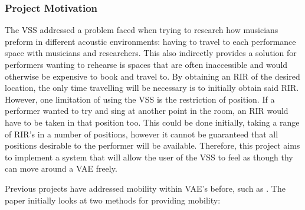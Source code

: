 \documentclass[../../main.tex]{subfiles}
\begin{document}
	\subsubsection{Project Motivation}
		

		The \ac{VSS} addressed a problem faced when trying to research how musicians preform in different acoustic environments: having to travel to each performance space with musicians and researchers. This also indirectly provides a solution for performers wanting to rehearse is spaces that are often inaccessible and would otherwise be expensive to book and travel to. By obtaining an \ac{RIR} of the desired location, the only time travelling will be necessary is to initially obtain said \ac{RIR}. However, one limitation of using the \ac{VSS} is the restriction of position. If a performer wanted to try and sing at another point in the room, an \ac{RIR} would have to be taken in that position too. This could be done initially, taking a range of \ac{RIR}'s in a number of positions, however it cannot be guaranteed that all positions desirable to the performer will be available. Therefore, this project aims to implement a system that will allow the user of the \ac{VSS} to feel as though thy can move around a \ac{VAE} freely.


		Previous projects have addressed mobility within \ac{VAE}'s before, such as \cite{Savioja1999}. The paper initially looks at two methods for providing mobility:

\end{document}
